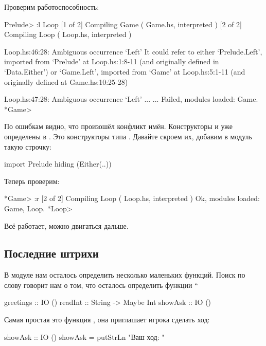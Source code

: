 Проверим работоспособность:


\begin{code}
Prelude> :l Loop
[1 of 2] Compiling Game             ( Game.hs, interpreted )
[2 of 2] Compiling Loop             ( Loop.hs, interpreted )

Loop.hs:46:28:
    Ambiguous occurrence `Left'
    It could refer to either `Prelude.Left',
                             imported from `Prelude' at Loop.hs:1:8-11
                             (and originally defined in `Data.Either')
                          or `Game.Left',
                             imported from `Game' at Loop.hs:5:1-11
                             (and originally defined at Game.hs:10:25-28)

Loop.hs:47:28:
    Ambiguous occurrence `Left'
...
...
Failed, modules loaded: Game.
*Game> 
\end{code}

По ошибкам видно, что произошёл конфликт имён. Конструкторы  и
 уже определены в . Это конструкторы типа
. Давайте скроем их, добавим в модуль такую строчку:


\begin{code}
import Prelude hiding (Either(..))
\end{code}

Теперь проверим:


\begin{code}
*Game> :r
[2 of 2] Compiling Loop             ( Loop.hs, interpreted )
Ok, modules loaded: Game, Loop.
*Loop> 
\end{code}

Всё работает, можно двигаться дальше.

\subsection{Последние штрихи}

В модуле  нам осталось определить несколько маленьких функций.
Поиск по слову  говорит нам о том, что осталось определить
функции ``


\begin{code}
greetings   :: IO ()
readInt     :: String -> Maybe Int
showAsk     :: IO ()
\end{code}

Самая простая это функция , она приглашает игрока сделать
ход:


\begin{code}
showAsk :: IO ()
showAsk = putStrLn "Ваш ход: "
\end{code}

